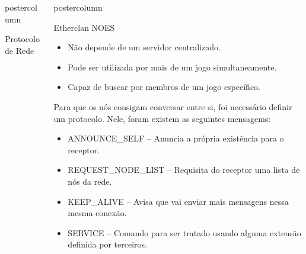 \documentclass[final]{beamer}
\newlength{\columnheight}
\begin{document}
\begin{frame}
\begin{columns}
\begin{column}{.5\textwidth}
\begin{beamercolorbox}[center,wd=\textwidth]{postercolumn}
\begin{minipage}[T]{.95\textwidth}
{\begin{block}{Protocolo de Rede}
                \vspace*{0.2cm} 
            \end{block}
          }
        \end{minipage}
      \end{beamercolorbox}
    \end{column}

    \begin{column}{.5\textwidth}
      \begin{beamercolorbox}[center,wd=\textwidth]{postercolumn}
        \begin{minipage}[T]{.95\textwidth} %
          \parbox[t][\columnheight]{\textwidth}{ %
            
            \vspace*{0.8cm}
            
            \begin{block}{Etherclan}
                NOES
                \begin{itemize}
                  \item Não depende de um servidor centralizado.
                  \item Pode ser utilizada por mais de um jogo simultaneamente.
                  \item Capaz de buscar por membros de um jogo específico.
                \end{itemize}
                
                \vspace*{0.5cm}
                Para que os nós consigam conversar entre si, foi necessário definir um protocolo. 
                Nele, foram existem as seguintes mensagems:
                \begin{itemize}
                  \item ANNOUNCE\_SELF -- Anuncia a própria existência para o receptor.
                  \item REQUEST\_NODE\_LIST -- Requisita do receptor uma lista de nós da rede.
                  \item KEEP\_ALIVE -- Avisa que vai enviar mais mensagens nessa mesma conexão.
                  \item SERVICE -- Comando para ser tratado usando alguma extensão definida por terceiros.
                \end{itemize}
                

\end{block}}
\end{minipage}
\end{beamercolorbox}
\end{column}
\end{columns}
\end{frame}
\end{document}
